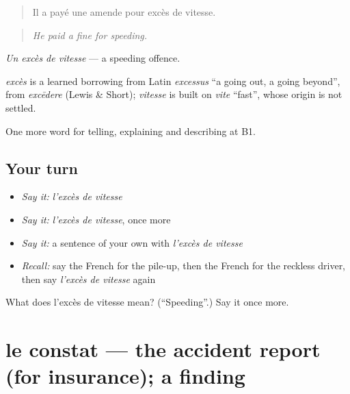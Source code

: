 \begin{quote}
Il a payé une amende pour excès de vitesse.
\end{quote}

\begin{quote}
\emph{He paid a fine for speeding.}
\end{quote}

\emph{Un excès de vitesse} — a speeding offence.

\begin{cousinweb}
\emph{excès} is a learned borrowing from Latin \emph{excessus} \textquotedblleft{}a going out, a going beyond\textquotedblright{}, from \emph{excēdere} (Lewis \& Short); \emph{vitesse} is built on \emph{vite} \textquotedblleft{}fast\textquotedblright{}, whose origin is not settled.
\end{cousinweb}

\begin{grammarlens}[title={What you've built}]
One more word for telling, explaining and describing at B1.
\end{grammarlens}

\subsection*{Your turn}
\begin{itemize}
\raggedright
  \item \emph{Say it:} \emph{l'excès de vitesse}
  \item \emph{Say it:} \emph{l'excès de vitesse}, once more
  \item \emph{Say it:} a sentence of your own with \emph{l'excès de vitesse}
  \item \emph{Recall:} say the French for the pile-up, then the French for the reckless driver, then say \emph{l'excès de vitesse} again
\end{itemize}

\begin{tcolorbox}[breakable,colback=teal!4,colframe=teal!35!black,title={Before you move on}]
What does l'excès de vitesse mean? (\textquotedblleft{}Speeding\textquotedblright{}.) Say it once more.
\end{tcolorbox}
\section[le constat]{le constat — the accident report (for insurance); a finding}

\label{lesson:FR-C297-constat}



